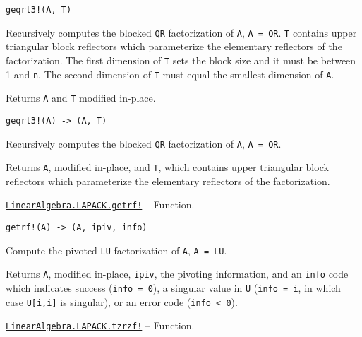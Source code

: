 \begin{adjustwidth}{2em}{0pt}


\begin{verbatim}
geqrt3!(A, T)
\end{verbatim}

Recursively computes the blocked \texttt{QR} factorization of \texttt{A}, \texttt{A = QR}. \texttt{T} contains upper triangular block reflectors which parameterize the elementary reflectors of the factorization.  The first dimension of \texttt{T} sets the block size and it must be between 1 and \texttt{n}. The second dimension of \texttt{T} must equal the smallest dimension of \texttt{A}.

Returns \texttt{A} and \texttt{T} modified in-place.




\begin{lstlisting}
geqrt3!(A) -> (A, T)
\end{lstlisting}

Recursively computes the blocked \texttt{QR} factorization of \texttt{A}, \texttt{A = QR}.

Returns \texttt{A}, modified in-place, and \texttt{T}, which contains upper triangular block reflectors which parameterize the elementary reflectors of the factorization.



\end{adjustwidth}
\hypertarget{2351778938398249720}{} 
\hyperlink{2351778938398249720}{\texttt{LinearAlgebra.LAPACK.getrf!}}  -- {Function.}

\begin{adjustwidth}{2em}{0pt}


\begin{verbatim}
getrf!(A) -> (A, ipiv, info)
\end{verbatim}

Compute the pivoted \texttt{LU} factorization of \texttt{A}, \texttt{A = LU}.

Returns \texttt{A}, modified in-place, \texttt{ipiv}, the pivoting information, and an \texttt{info} code which indicates success (\texttt{info = 0}), a singular value in \texttt{U} (\texttt{info = i}, in which case \texttt{U[i,i]} is singular), or an error code (\texttt{info < 0}).



\end{adjustwidth}
\hypertarget{8099284094733410089}{} 
\hyperlink{8099284094733410089}{\texttt{LinearAlgebra.LAPACK.tzrzf!}}  -- {Function.}

